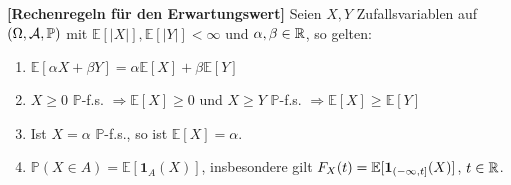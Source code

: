 \begin{prop}\label{rechenregeln}
 \textbf{[Rechenregeln f\"ur den Erwartungswert]}
	Seien $X,Y$ Zufallsvariablen auf $(\Omega, \mathcal{A}, \mathbb{P})$ mit $\mathbb{E}[|X|],\mathbb{E}[|Y|] < \infty$ und $\alpha,\beta\in\mathbb{R}$, so gelten:
	\begin{enumerate}[label=(\roman*)]
		\item $\mathbb{E}[\alpha X + \beta Y] = \alpha \mathbb{E}[X] + \beta \mathbb{E}[Y]$
		\item $X \geq 0$ $\mathbb P$-f.s. $\Rightarrow \mathbb{E}[X] \geq 0$ und  $X \geq Y$ $\mathbb P$-f.s. $\Rightarrow \mathbb{E}[X] \geq \mathbb{E}[Y]$
		\item Ist $X = \alpha$  $\mathbb{P}$-f.s., so ist $\mathbb{E}[X] = \alpha$.
		\item $\mathbb{P}(X \in A) = \mathbb{E}[\mathbf{1}_A(X)]$, insbesondere gilt $F_X(t)=\mathbb{E}[\mathbf 1_{(-\infty,t]}(X)]$, $t\in\mathbb{R}$.
	\end{enumerate}
\end{prop}

